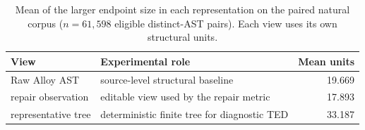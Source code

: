\begin{table}[H]
\centering
\caption{Mean of the larger endpoint size in each representation on the paired natural corpus
($n=61{,}598$ eligible distinct-AST pairs). Each view uses its own structural
units.}
\label{tab:compact}
\small
\begin{tabular}{@{}p{4.3cm}p{5.5cm}r@{}}
\toprule
View & Experimental role & Mean units\\
\midrule
Raw Alloy AST & source-level structural baseline & 19.669\\
\CanDis{} repair observation & editable view used by the repair metric & 17.893\\
\CanDis{} representative tree & deterministic finite tree for diagnostic TED & 33.187\\
\bottomrule
\end{tabular}
\end{table}

